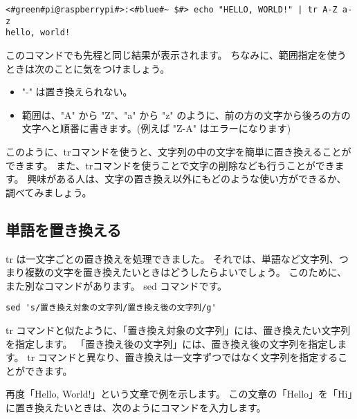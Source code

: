 \begin{lstlisting}[caption=範囲指定を使った置き換え, label=tr_range]
<#green#pi@raspberrypi#>:<#blue#~ $#> echo "HELLO, WORLD!" | tr A-Z a-z
hello, world!
\end{lstlisting}

このコマンドでも先程と同じ結果が表示されます。
ちなみに、範囲指定を使うときは次のことに気をつけましょう。
\begin{itemize}
    \item "-" は置き換えられない。
    \item 範囲は、"A" から "Z"、"a" から "z" のように、前の方の文字から後ろの方の文字へと順番に書きます。(例えば "Z-A" はエラーになります) 
\end{itemize}

このように、trコマンドを使うと、文字列の中の文字を簡単に置き換えることができます。
また、trコマンドを使うことで文字の削除なども行うことができます。
興味がある人は、文字の置き換え以外にもどのような使い方ができるか、調べてみましょう。

\begin{tcolorbox}[title=\useOmetoi]
    \begin{enumerate}
    \end{enumerate}
\end{tcolorbox}

\subsection{単語を置き換える}
tr は一文字ごとの置き換えを処理できました。
それでは、単語など文字列、つまり複数の文字を置き換えたいときはどうしたらよいでしょう。
このために、また別なコマンドがあります。
sed コマンドです。

\begin{lstlisting}[caption=sed コマンドの基本的な使い方, label=sed_usage]
sed 's/置き換え対象の文字列/置き換え後の文字列/g'
\end{lstlisting}

tr コマンドと似たように、「置き換え対象の文字列」には、置き換えたい文字列を指定します。
「置き換え後の文字列」には、置き換え後の文字列を指定します。
tr コマンドと異なり、置き換えは一文字ずつではなく文字列を指定することができます。

再度「Hello, World!」という文章で例を示します。
この文章の「Hello」を「Hi」に置き換えたいときは、次のようにコマンドを入力します。


